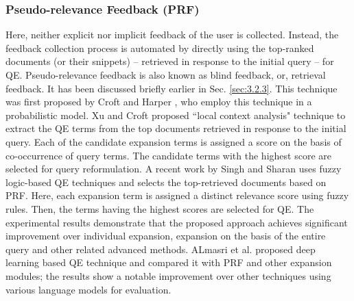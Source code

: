 \subsubsection{Pseudo-relevance Feedback (PRF)}
Here, neither explicit nor implicit feedback  of the user is collected. Instead, the feedback collection process is automated by directly using the top-ranked documents (or their snippets) -- retrieved in response to the initial query -- for QE. Pseudo-relevance feedback is also known as  blind feedback, or, retrieval feedback. It has been discussed briefly earlier in Sec. \ref{sec:3.2.3}. This technique was first proposed by Croft and Harper \cite{croft1979using}, who employ this technique in a probabilistic model. Xu and Croft \cite{xu2000improving} proposed ``local context analysis" technique to extract the QE terms from the top documents retrieved in response to the initial query. Each of the candidate expansion terms is assigned a score on the basis of co-occurrence of query terms.  The candidate terms with the highest score are selected for query reformulation. A recent work by Singh and Sharan \cite{singh2016new} uses fuzzy logic-based QE techniques and selects the top-retrieved documents based on PRF. Here, each expansion term is assigned a distinct relevance score using fuzzy rules. Then, the terms having the highest scores are selected for QE. The experimental results demonstrate that the proposed approach achieves significant improvement over individual expansion, expansion on the basis of the entire query and other related advanced methods. ALmasri et al. \cite{almasri2016comparison} proposed deep learning based QE technique and compared it with PRF and other expansion modules; the results show a notable improvement over other techniques using various language models for evaluation.

